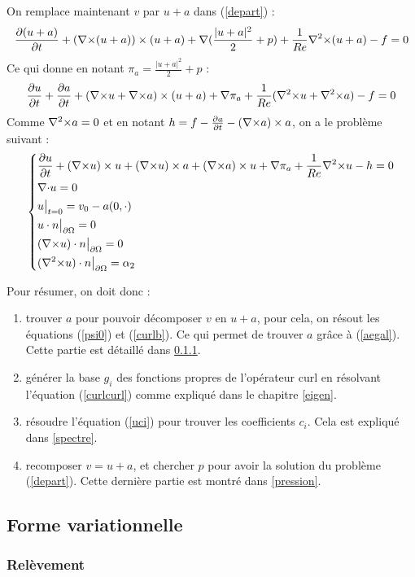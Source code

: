 On remplace maintenant $v$ par $u+a$ dans (\ref{depart}) :
\[
\frac{\partial(u+a)}{\partial t}+({\nabla\times}(u+a))\times(u+a) + {\nabla} (\frac{|u+a|^2}{2}+p) + \frac{1}{Re}{\nabla^2\times}(u+a) - f = 0
\]
Ce qui donne en notant $\pi_a=\frac{|u+a|^2}{2}+p$ :
\[
\frac{\partial u}{\partial t}+\frac{\partial a}{\partial t} + ({\nabla\times} u+{\nabla\times} a)\times(u+a) + {\nabla}\pi_a + \frac{1}{Re}({\nabla^2\times} u+{\nabla^2\times} a) - f = 0
\]
Comme ${\nabla^2\times} a = 0$ et en notant $h=f-\frac{\partial a}{\partial t} - ({\nabla\times} a)\times a$, on a le problème suivant :
\begin{eqnarray}
\label{uci}
\left\{
\begin{aligned}
&\frac{\partial u}{\partial t} + ({\nabla\times} u)\times u + ({\nabla\times} u)\times a +({\nabla\times} a)\times u + {\nabla} \pi_a +\frac{1}{Re}{\nabla^2\times}  u - h = 0\\
&{\nabla\cdot} u = 0\\
&u\big\rvert_{t=0} = v_0 - a(0,\cdot)\\
&u\cdot n{\big\rvert_{\partial\Omega}} = 0\\
&({\nabla\times} u)\cdot n{\big\rvert_{\partial\Omega}} = 0\\
&({\nabla^2\times}  u)\cdot n{\big\rvert_{\partial\Omega}} = \alpha_2
\end{aligned}
\right.
\end{eqnarray}

Pour résumer, on doit donc :
\begin{enumerate}
\item trouver $a$ pour pouvoir décomposer $v$ en $u+a$, pour cela, on résout les équations (\ref{psi0}) et (\ref{curlb}). Ce qui permet de trouver $a$ grâce à (\ref{aegal}). Cette partie est détaillé dans \ref{relev}.
\item générer la base $g_i$ des fonctions propres de l'opérateur curl en résolvant l'équation (\ref{curlcurl}) comme expliqué dans le chapitre \ref{eigen}.
\item résoudre l'équation (\ref{uci}) pour trouver les coefficients $c_i$. Cela est expliqué dans \ref{spectre}.
\item recomposer $v=u+a$, et chercher $p$ pour avoir la solution du problème (\ref{depart}). Cette dernière partie est montré dans \ref{pression}.
\end{enumerate}

\subsection{Forme variationnelle}
\subsubsection{Relèvement}
\label{relev}

